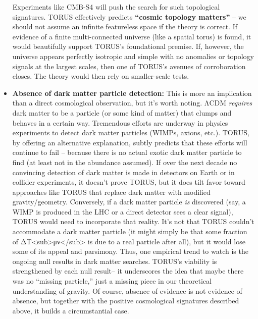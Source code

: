 \documentclass[
]{article}
\begin{document}
\begin{itemize}
  Experiments like CMB-S4 will push the search for such topological
  signatures\hspace{0pt}. TORUS effectively predicts \textbf{``cosmic
  topology matters''} -- we should not assume an infinite featureless
  space if the theory is correct. If evidence of a finite
  multi-connected universe (like a spatial torus) is found, it would
  beautifully support TORUS's foundational premise. If, however, the
  universe appears perfectly isotropic and simple with no anomalies or
  topology signals at the largest scales, then one of TORUS's avenues of
  corroboration closes. The theory would then rely on smaller-scale
  tests.
\item
  \textbf{Absence of dark matter particle detection:} This is more an
  implication than a direct cosmological observation, but it's worth
  noting. ΛCDM \emph{requires} dark matter to be a particle (or some
  kind of matter) that clumps and behaves in a certain way. Tremendous
  efforts are underway in physics experiments to detect dark matter
  particles (WIMPs, axions, etc.). TORUS, by offering an alternative
  explanation, subtly predicts that these efforts will continue to fail
  -- because there is no actual exotic dark matter particle to find (at
  least not in the abundance assumed). If over the next decade no
  convincing detection of dark matter is made in detectors on Earth or
  in collider experiments, it doesn't prove TORUS, but it does tilt
  favor toward approaches like TORUS that replace dark matter with
  modified gravity/geometry. Conversely, if a dark matter particle
  \emph{is} discovered (say, a WIMP is produced in the LHC or a direct
  detector sees a clear signal), TORUS would need to incorporate that
  reality. It's not that TORUS couldn't accommodate a dark matter
  particle (it might simply be that some fraction of
  ΔT\textless sub\textgreater μν\textless/sub\textgreater{} is due to a
  real particle after all), but it would lose some of its appeal and
  parsimony. Thus, one empirical trend to watch is the ongoing null
  results in dark matter searches. TORUS's viability is strengthened by
  each null result\hspace{0pt}-- it underscores the idea that maybe
  there was no ``missing particle,'' just a missing piece in our
  theoretical understanding of gravity. Of course, absence of evidence
  is not evidence of absence, but together with the positive
  cosmological signatures described above, it builds a circumstantial
  case.
\end{itemize}
\end{document}
